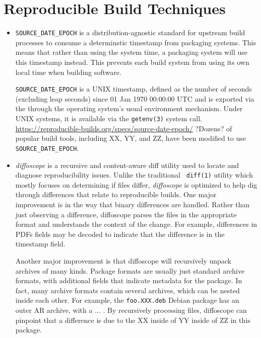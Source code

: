\section{Reproducible Build Techniques}
\label{SEC:techniques}


\begin{itemize}

\item {\tt SOURCE\_DATE\_EPOCH} is a distribution-agnostic standard for
upstream build processes to consume a determinstic timestamp from packaging
systems. This means that rather than using the system time, a packaging 
system will use this timestamp instead.  This prevents each build system
from using its own local time when building software.  

{\tt SOURCE\_DATE\_EPOCH} is a UNIX timestamp, defined as the number of seconds
(excluding leap seconds) since 01 Jan 1970 00:00:00 UTC and is exported via
the through the operating system's usual environment mechanism. Under UNIX
systems, it is available via the {\tt getenv(3)} system call.  
\url{https://reproducible-builds.org/specs/source-date-epoch/}
?Dozens? of popular build tools, including XX, YY, and ZZ, have been 
modified to use {\tt SOURCE\_DATE\_EPOCH}.

\item {\em diffoscope} is a recursive and content-aware diff utility used
to locate and diagnose reproducibility issues. Unlike the traditional {\tt
diff(1)} utility which mostly focuses on determining if files differ, 
{\em diffoscope} is optimized to help dig through differences that relate 
to reproducible builds.  One major improvement is in the way that binary
differences are handled.  Rather than just observing a difference,
diffoscope parses the files in the appropriate format and understands the
context of the change.  For example, differences in PDFs fields may be
decoded to indicate that the difference is in the timestamp field.

Another major improvement is that diffoscope will recursively unpack 
archives of many kinds.  Package formats are usually just standard archive
formats, with additional fields that indicate metadata for the package.  In
fact, many archive formats contain several archives, which can be nested
inside each other.  For example, the {\tt foo.XXX.deb} Debian package has 
an outer AR archive, with a ... .  By
recursively processing files, diffoscope can pinpoint that a difference is
due to the XX inside of YY inside of ZZ in this package.

\end{itemize}
